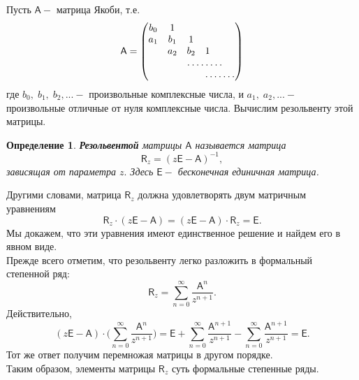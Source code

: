 \documentclass[12pt,a4paper]{article}
\theoremstyle{plain}   \newtheorem{Pro}{Задача}
\newtheorem{Def}{Определение}
\begin{document}
Пусть
$ \mathsf{A} - $
матрица Якоби, т.е.
\begin{equation*}
  \mathsf{A}=
    \begin{pmatrix}
	  b_0 & 1 & \; & \; & \; & \; \\
	  a_1 & b_1 & 1 & \; & \; & \; \\
	  \; & a_2 & b_2 & 1 & \; & \; \\
	  \; & \; & \hdotsfor{3}  & \; \\
	  \; & \; & \; & \hdotsfor{3}
	\end{pmatrix}
\end{equation*}
где
$ b_0 , \; b_1 , \; b_2 ,... - $
произвольные комплексные числа, и
$ a_1 , \; a_2 ,... - $
произвольные отличные от нуля комплексные числа.
Вычислим резольвенту этой матрицы.
\begin{Def}
{\bfseries Резольвентой} матрицы
$ \mathsf{A} $
называется матрица
$$
  \mathsf{R}_z =(z \mathsf{E} - \mathsf{A} ) ^{-1},
$$
зависящая от параметра
$ z . $
Здесь
$ \mathsf{E} - $
бесконечная единичная матрица.
\end{Def}
Другими словами, матрица
$ \mathsf{R}_z $
должна удовлетворять двум матричным уравнениям
$$
  \mathsf{R}_z \cdot (z \mathsf{E} - \mathsf{A} ) =
  (z \mathsf{E} - \mathsf{A} ) \cdot \mathsf{R}_z =
  \mathsf{E} .
$$
Мы докажем, что эти уравнения имеют единственное решение и
найдем его в явном виде.
\\

Прежде всего отметим, что резольвенту легко разложить в
формальный степенной ряд:
$$
  \mathsf{R}_z = \sum _{n=0}^{\infty}
  \frac{ \mathsf{A}^n }{z^{n+1} }.
$$
Действительно,
$$
  (z \mathsf{E} - \mathsf{A} ) \cdot
  \biggl ( \sum _{n=0}^{\infty}
  \frac{\mathsf{A}^n }{z^{n+1}} \biggr ) =
  \mathsf{E}+\sum _{n=0}^{\infty}
  \frac{\mathsf{A}^{n+1}}{z^{n+1}}-
  \sum _{n=0}^{\infty} \frac{ \mathsf{A}^{n+1}}
  {z^{n+1}}= \mathsf{E}.
$$
Тот же ответ получим перемножая матрицы в другом порядке.\\
Таким образом, элементы матрицы
$ \mathsf{R}_z $
суть формальные степенные ряды.
\\
\end{document}
